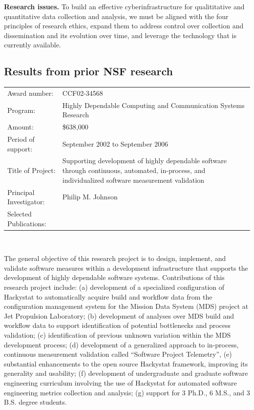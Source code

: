 {\bf Research issues.}  To build an effective
cyberinfrastructure for qualititative and quantitative data collection and
analysis, we must be aligned with the four principles of research ethics,
expand them to address control over collection and dissemination and its
evolution over time, and leverage the technology that is currently
available.

\subsection{Results from prior NSF research}

\small
\begin{tabular}{lp{4.5in}}

Award number: & CCF02-34568 \\
Program: & Highly Dependable Computing and Communication Systems Research\\
Amount: & \$638,000 \\
Period of support: & September 2002 to September 2006 \\
Title of Project: & Supporting development of highly dependable software through
continuous, automated, in-process, and individualized software measurement validation \\
Principal Investigator: & Philip M. Johnson \\
Selected Publications: & \cite{csdl2-04-22,csdl2-04-13,csdl2-04-11,csdl2-03-12,csdl2-02-07,csdl2-03-07,csdl2-04-02,csdl2-04-04,csdl2-04-06}
\end{tabular} \\ %
\normalsize

\medskip

The general objective of this research project is to design, implement, and
validate software measures within a development infrastructure that
supports the development of highly dependable software systems.
Contributions of this research project include: (a) development of a
specialized configuration of Hackystat to automatically acquire build and
workflow data from the configuration management system for the Mission Data
System (MDS) project at Jet Propulsion Laboratory; (b) development of
analyses over MDS build and workflow data to support identification of
potential bottlenecks and process validation; (c) identification of
previous unknown variation within the MDS development process; (d)
development of a generalized approach to in-process, continuous measurement
validation called ``Software Project Telemetry'', (e) substantial
enhancements to the open source Hackystat framework, improving its
generality and usability; (f) development of undergraduate and graduate
software engineering curriculum involving the use of Hackystat for
automated software engineering metrics collection and analysis; (g) support
for 3 Ph.D., 6 M.S., and 3 B.S. degree students. 

